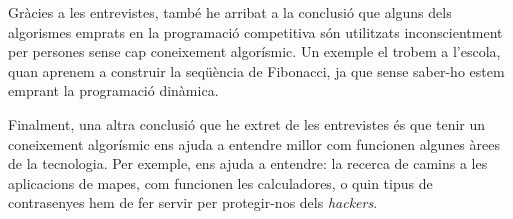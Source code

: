 Gràcies a les entrevistes, també he arribat a la conclusió que alguns dels algorismes emprats en la programació competitiva són utilitzats inconscientment per persones sense cap coneixement algorísmic. Un exemple el trobem a l'escola, quan aprenem a construir la seqüència de Fibonacci, ja que sense saber-ho estem emprant la programació dinàmica. \newline


Finalment, una altra conclusió que he extret de les entrevistes és que tenir un coneixement algorísmic ens ajuda a entendre millor com funcionen algunes àrees de la tecnologia. Per exemple, ens ajuda a entendre: la recerca de camins a les aplicacions de mapes, com funcionen les calculadores, o quin tipus de contrasenyes hem de fer servir per protegir-nos dels \emph{hackers}.











    
    
    

